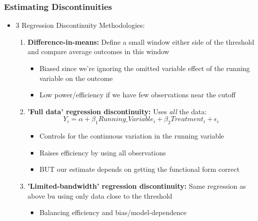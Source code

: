 \documentclass[xcolor=x11names,compress]{beamer}\usepackage[]{graphicx}\usepackage[]{color}
\renewcommand{\(}{\begin{columns}}
\renewcommand{\)}{\end{columns}}
\newcommand{\<}[1]{\begin{column}{#1}}
\renewcommand{\>}{\end{column}}
\begin{document}
\begin{frame}
\frametitle{Estimating Discontinuities}
\begin{itemize}
\item 3 Regression Discontinuity Methodologies:
\begin{enumerate}
\item \textbf{Difference-in-means:} Define a small window either side of the threshold and compare average outcomes in this window
\begin{itemize}
\item Biased since we're ignoring the omitted variable effect of the running variable on the outcome
\item Low power/efficiency if we have few observations near the cutoff
\pause
\end{itemize}
\item \textbf{'Full data' regression discontinuity:} Uses \textit{all} the data:
$$Y_i = \alpha + \beta_1 Running\_Variable_i + \beta_2 Treatment_i + \epsilon_i$$
\begin{itemize}
\item Controls for the continuous variation in the running variable
\item Raises efficiency by using all observations
\item BUT our estimate depends on getting the functional form correct
\pause
\end{itemize}
\item \textbf{'Limited-bandwidth' regression discontinuity:}  Same regression as above bu using only data close to the threshold
\begin{itemize}
\item Balancing efficiency and bias/model-dependence
\end{itemize}
\end{enumerate}
\end{itemize}
\end{frame}
\end{document}
